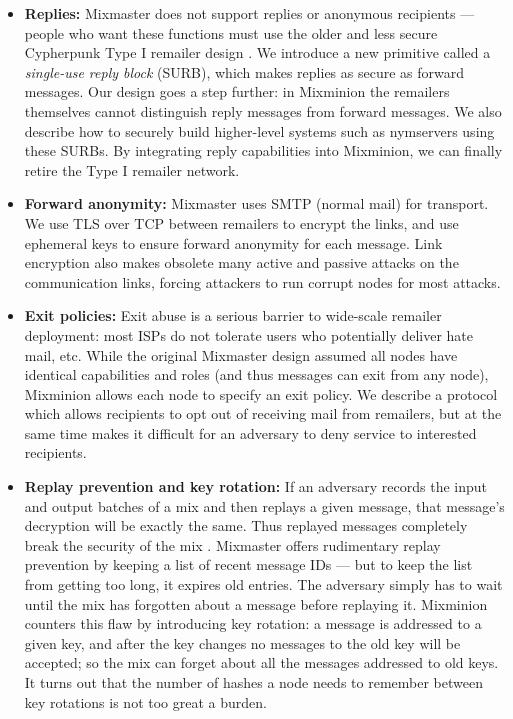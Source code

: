 \documentclass[11pt]{IEEEtran}
\begin{document}
\begin{itemize}
\item \textbf{Replies:} Mixmaster does not support replies or anonymous
recipients --- people who want these functions must use the older and
less secure Cypherpunk Type I remailer design \cite{remailer-history}. We
introduce a new primitive called a \emph{single-use reply block} (SURB),
which makes replies as secure as forward messages. Our design goes a
step further: in Mixminion the remailers themselves cannot distinguish
reply messages from forward messages. We also describe how to securely
build higher-level systems such as nymservers using these SURBs. By
integrating reply capabilities into Mixminion, we can finally retire
the Type I remailer network.

\item \textbf{Forward anonymity:} Mixmaster uses SMTP (normal mail) for
transport. We use TLS over TCP between remailers to encrypt the links,
and use ephemeral keys to ensure forward anonymity for
each message. Link encryption also makes obsolete many active and
passive attacks on the communication links, forcing attackers to run
corrupt nodes for most attacks.


\item \textbf{Exit policies:} Exit abuse is a serious barrier to wide-scale
remailer deployment: most ISPs do not tolerate users who potentially
deliver hate mail, etc. While the original Mixmaster design assumed all
nodes have identical capabilities and roles (and thus messages can exit
from any node), Mixminion allows each node to specify an exit policy. We
describe a protocol which allows recipients to opt out of receiving mail
from remailers, but at the same time makes it difficult for an adversary
to deny service to interested recipients.

\item \textbf{Replay prevention and key rotation:} 
If an adversary records the input and output batches of a mix and then
replays a given message, that message's decryption will be exactly the
same. Thus replayed messages completely break the security of the mix
\cite{chaum-mix}. Mixmaster offers rudimentary replay prevention by
keeping a list of recent message IDs --- but to keep the list from
getting too long, it expires old entries. The adversary simply has to
wait until the mix has forgotten about a
message before replaying it. Mixminion counters this flaw by introducing
key rotation: a message is addressed to a given key, and after the key
changes no messages to the old key will be accepted; so the mix can forget
about all the messages addressed to old keys. It turns out that the
number of hashes a node needs to remember between key rotations is not
too great a burden.


\end{itemize}
\end{document}
